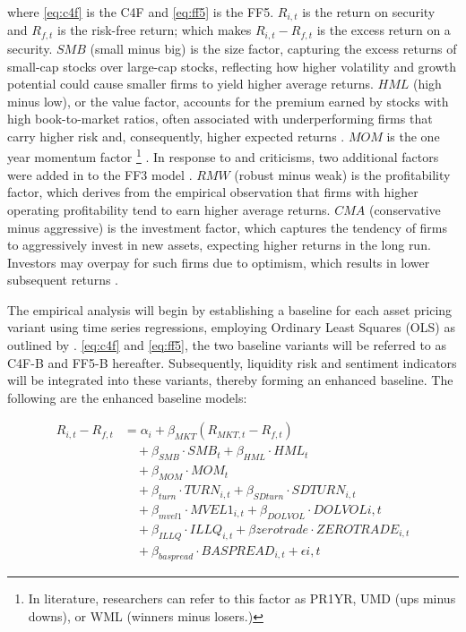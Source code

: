 where \cref{eq:c4f} is the C4F and \cref{eq:ff5} is the FF5. $R_{i,t}$ is the return on security and $R_{f,t}$ is the risk-free return; which makes $R_{i,t} - R_{f,t}$ is the excess return on a security. $SMB$ (small minus big) is the size factor, capturing the excess returns of small-cap stocks over large-cap stocks, reflecting how higher volatility and growth potential could cause smaller firms to yield higher average returns. $HML$ (high minus low), or the value factor, accounts for the premium earned by stocks with high book-to-market ratios, often associated with underperforming firms that carry higher risk and, consequently, higher expected returns \cite{ff3_1993}. $MOM$ is the one year momentum factor \footnote{In literature, researchers can refer to this factor as PR1YR, UMD (ups minus downs), or WML (winners minus losers.)} \cite{cahart_1997}. In response to  and  criticisms, two additional factors were added in to the FF3 model \cite{ff5_2015}. $RMW$ (robust minus weak) is the profitability factor, which derives from the empirical observation that firms with higher operating profitability tend to earn higher average returns. $CMA$ (conservative minus aggressive) is the investment factor, which captures the tendency of firms to aggressively invest in new assets, expecting higher returns in the long run. Investors may overpay for such firms due to optimism, which results in lower subsequent returns \cite{titman_2004}.

The empirical analysis will begin by establishing a baseline for each asset pricing variant using time series regressions, employing Ordinary Least Squares (OLS) as outlined by . \cref{eq:c4f} and \cref{eq:ff5}, the two baseline variants will be referred to as C4F-B and FF5-B hereafter. Subsequently, liquidity risk and sentiment indicators will be integrated into these variants, thereby forming an enhanced baseline. The following are the enhanced baseline models:

\begin{equation}
    \label{eq:c4f_expanded}
    \begin{split}
    R_{i,t} - R_{f,t} &= \alpha_i + \beta_{MKT} (R_{MKT,t} - R_{f,t}) \\
    &\quad + \beta_{SMB} \cdot SMB_t + \beta_{HML} \cdot HML_t \\
    &\quad + \beta_{MOM} \cdot MOM_t \\
    &\quad + \beta_{turn} \cdot TURN_{i,t} + \beta_{SDturn} \cdot SDTURN_{i,t} \\
    &\quad + \beta_{mvel1} \cdot MVEL1_{i,t} + \beta_{DOLVOL} \cdot DOLVOL{i,t} \\
    &\quad + \beta_{ILLQ} \cdot ILLQ_{i,t} + \beta{zerotrade} \cdot ZEROTRADE_{i,t} \\
    &\quad + \beta_{baspread} \cdot BASPREAD_{i,t} + \epsilon{i,t}
    \end{split}
\end{equation}

